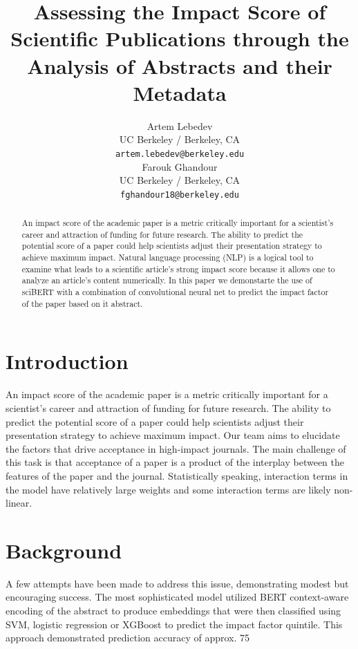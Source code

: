\documentclass[11pt]{article}
\title{Assessing the Impact Score of Scientific Publications through the Analysis of Abstracts and their Metadata}
\author{Artem Lebedev\\
  UC Berkeley / Berkeley, CA \\
  \texttt{artem.lebedev@berkeley.edu} \\\And
 Farouk Ghandour \\
  UC Berkeley / Berkeley, CA \\
  \texttt{fghandour18@berkeley.edu} \\}
\begin{document}
\maketitle
\begin{abstract}
An impact score of the academic paper is a metric critically important for a scientist's career and attraction of funding for future research. The ability to predict the potential score of a paper could help scientists adjust their presentation strategy to achieve maximum impact. Natural language processing (NLP) is a logical tool to examine what leads to a scientific article's strong impact score because it allows one to analyze an article’s content numerically. In this paper we demonstarte the use of sciBERT with a combination of convolutional neural net to predict the impact factor of the paper based on it abstract.
\end{abstract}

\section{Introduction}
An impact score of the academic paper is a metric critically important for a scientist's career and attraction of funding for future research. The ability to predict the potential score of a paper could help scientists adjust their presentation strategy to achieve maximum impact. Our team aims to elucidate the factors that drive acceptance in high-impact journals. The main challenge of this task is that acceptance of a paper is a product of the interplay between the features of the paper and the journal. Statistically speaking, interaction terms in the model have relatively large weights and some interaction terms are likely non-linear. 

\section{Background}
A few attempts have been made to address this issue, demonstrating modest but encouraging success. \citep{Macri2023-tr, Alohali2022-no, 10.1162/qss_a_00258, doi:10.1152/japplphysiol.00489.2020} The most sophisticated model utilized BERT context-aware encoding of the abstract to produce embeddings that were then classified using  SVM, logistic regression or XGBoost to predict the impact factor quintile. This approach demonstrated prediction accuracy of approx. 75%
\end{document}
